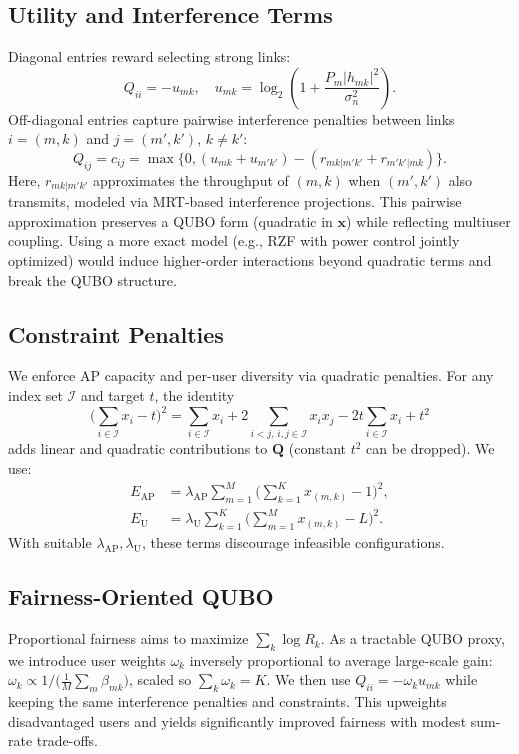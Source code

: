 \subsection{Utility and Interference Terms}
Diagonal entries reward selecting strong links:
\begin{equation}
Q_{ii}=-u_{mk},\quad u_{mk}=\log_2\!\left(1+\frac{P_m|h_{mk}|^2}{\sigma_n^2}\right).
\end{equation}
Off-diagonal entries capture pairwise interference penalties between links $i=(m,k)$ and $j=(m',k')$, $k\neq k'$:
\begin{equation}
Q_{ij}=c_{ij}=\max\!\Big\{0,(u_{mk}+u_{m'k'}) -(r_{mk|m'k'}+r_{m'k'|mk})\Big\}.
\end{equation}
Here, $r_{mk|m'k'}$ approximates the throughput of $(m,k)$ when $(m',k')$ also transmits, modeled via MRT-based interference projections. This pairwise approximation preserves a QUBO form (quadratic in $\mathbf{x}$) while reflecting multiuser coupling. Using a more exact model (e.g., RZF with power control jointly optimized) would induce higher-order interactions beyond quadratic terms and break the QUBO structure.

\subsection{Constraint Penalties}
We enforce AP capacity and per-user diversity via quadratic penalties. For any index set $\mathcal{I}$ and target $t$, the identity
\begin{equation}
\bigg(\sum_{i\in \mathcal{I}} x_i - t\bigg)^2=\sum_{i\in\mathcal{I}}x_i + 2\!\!\sum_{i<j,\,i,j\in\mathcal{I}}\!\! x_ix_j - 2t\sum_{i\in\mathcal{I}}x_i + t^2
\end{equation}
adds linear and quadratic contributions to $\mathbf{Q}$ (constant $t^2$ can be dropped). We use:
\begin{align}
E_{\text{AP}}&=\lambda_{\text{AP}} \sum_{m=1}^M \Big(\sum_{k=1}^K x_{(m,k)} - 1\Big)^2,\\
E_{\text{U}}&=\lambda_{\text{U}} \sum_{k=1}^K \Big(\sum_{m=1}^M x_{(m,k)} - L\Big)^2.
\end{align}
With suitable $\lambda_{\text{AP}},\lambda_{\text{U}}$, these terms discourage infeasible configurations.

\subsection{Fairness-Oriented QUBO}
Proportional fairness aims to maximize $\sum_k \log R_k$. As a tractable QUBO proxy, we introduce user weights $\omega_k$ inversely proportional to average large-scale gain: $\omega_k \propto 1/\big(\frac{1}{M}\sum_m \beta_{mk}\big)$, scaled so $\sum_k \omega_k=K$. We then use $Q_{ii}=-\omega_k u_{mk}$ while keeping the same interference penalties and constraints. This upweights disadvantaged users and yields significantly improved fairness with modest sum-rate trade-offs.

